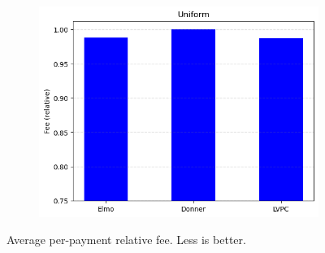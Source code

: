 \begin{figure}
\begin{subfigure}{.3293\textwidth}
  \includegraphics[width=\textwidth]{../simulation/Fees_uniform.png}
  \end{subfigure}
  \caption{Average per-payment relative fee. Less is better.}
  \label{graph:fees}
  \end{figure}
  \addtolength{\intextsep}{15pt}
